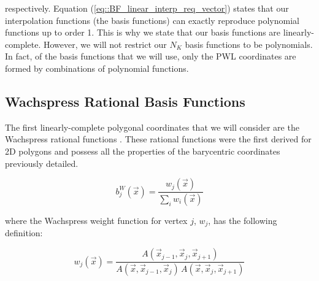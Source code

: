 \noindent respectively. Equation (\ref{eq::BF_linear_interp_req_vector}) states that our interpolation functions (the basis functions) can exactly reproduce polynomial functions up to order 1. This is why we state that our basis functions are linearly-complete. However, we will not restrict our $N_K$ basis functions to be polynomials. In fact, of the basis functions that we will use, only the PWL coordinates are formed by combinations of polynomial functions.


\subsection{Wachspress Rational Basis Functions}
\label{sec::BF_2DLinear_Wachspress}

The first linearly-complete polygonal coordinates that we will consider are the Wachspress rational functions \cite{wachspress1975rational}. These rational functions were the first derived for 2D polygons and possess all the properties of the barycentric coordinates previously detailed.

\begin{equation}
\label{eq::BF_wach_BF}
b_{j}^{W} (\vec{x}) = \frac{w_j (\vec{x}) }{\sum_i w_i (\vec{x})}
\end{equation}

\noindent where the Wachspress weight function for vertex $j$, $w_j$, has the following definition:

\begin{equation}
\label{eq::BF_wach_weights}
w_j (\vec{x})  = \frac{A(\vec{x}_{j-1}, \vec{x}_{j}, \vec{x}_{j+1})}{A(\vec{x}, \vec{x}_{j-1}, \vec{x}_{j}) \, A(\vec{x}, \vec{x}_{j}, \vec{x}_{j+1})}
\end{equation}



